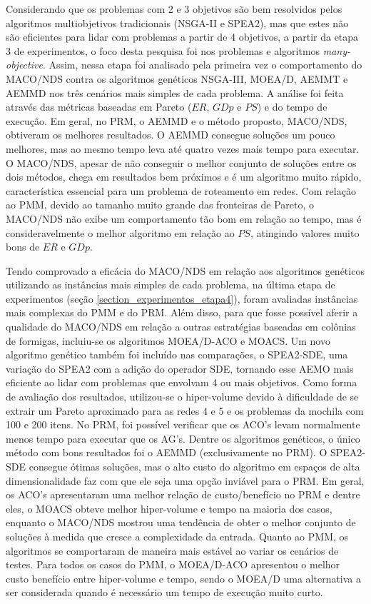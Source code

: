 Considerando que os problemas com 2 e 3 objetivos são bem resolvidos pelos algoritmos multiobjetivos tradicionais (NSGA-II e SPEA2), mas que estes não são eficientes para lidar com problemas a partir de 4 objetivos, a partir da etapa 3 de experimentos, o foco desta pesquisa foi nos problemas e algoritmos \textit{many-objective}. Assim, nessa etapa foi analisado pela primeira vez o comportamento do MACO/NDS contra os algoritmos genéticos NSGA-III, MOEA/D, AEMMT e AEMMD nos três cenários mais simples de cada problema. A análise foi feita através das métricas baseadas em Pareto ($ER$, $GDp$ e $PS$) e do tempo de execução. Em geral, no PRM, o AEMMD e o método proposto, MACO/NDS, obtiveram os melhores resultados. O AEMMD consegue soluções um pouco melhores, mas ao mesmo tempo leva até quatro vezes mais tempo para executar. O MACO/NDS, apesar de não conseguir o melhor conjunto de soluções entre os dois métodos, chega em resultados bem próximos e é um algoritmo muito rápido, característica essencial para um problema de roteamento em redes. Com relação ao PMM, devido ao tamanho muito grande das fronteiras de Pareto, o MACO/NDS não exibe um comportamento tão bom em relação ao tempo, mas é consideravelmente o melhor algoritmo em relação ao $PS$, atingindo valores muito bons de $ER$ e $GDp$.

Tendo comprovado a eficácia do MACO/NDS em relação aos algoritmos genéticos utilizando as instâncias mais simples de cada problema, na última etapa de experimentos (seção \ref{section_experimentos_etapa4}), foram avaliadas instâncias mais complexas do PMM e do PRM. Além disso, para que fosse possível aferir a qualidade do MACO/NDS em relação a outras estratégias baseadas em colônias de formigas, incluiu-se os algoritmos MOEA/D-ACO e MOACS. Um novo algoritmo genético também foi incluído nas comparações, o SPEA2-SDE, uma variação do SPEA2 com a adição do operador SDE, tornando esse AEMO mais eficiente ao lidar com problemas que envolvam 4 ou mais objetivos. Como forma de avaliação dos resultados, utilizou-se o hiper-volume devido à dificuldade de se extrair um Pareto aproximado para as redes 4 e 5 e os problemas da mochila com 100 e 200 itens. No PRM, foi possível verificar que os ACO's levam normalmente menos tempo para executar que os AG's. Dentre os algoritmos genéticos, o único método com bons resultados foi o AEMMD (exclusivamente no PRM). O SPEA2-SDE consegue ótimas soluções, mas o alto custo do algoritmo em espaços de alta dimensionalidade faz com que ele seja uma opção inviável para o PRM. Em geral, os ACO's apresentaram uma melhor relação de custo/benefício no PRM e dentre eles, o MOACS obteve melhor hiper-volume e tempo na maioria dos casos, enquanto o MACO/NDS mostrou uma tendência de obter o melhor conjunto de soluções à medida que cresce a complexidade da entrada. Quanto ao PMM, os algoritmos se comportaram de maneira mais estável ao variar os cenários de testes. Para todos os casos do PMM, o MOEA/D-ACO apresentou o melhor custo benefício entre hiper-volume e tempo, sendo o MOEA/D uma alternativa a ser considerada quando é necessário um tempo de execução muito curto.

